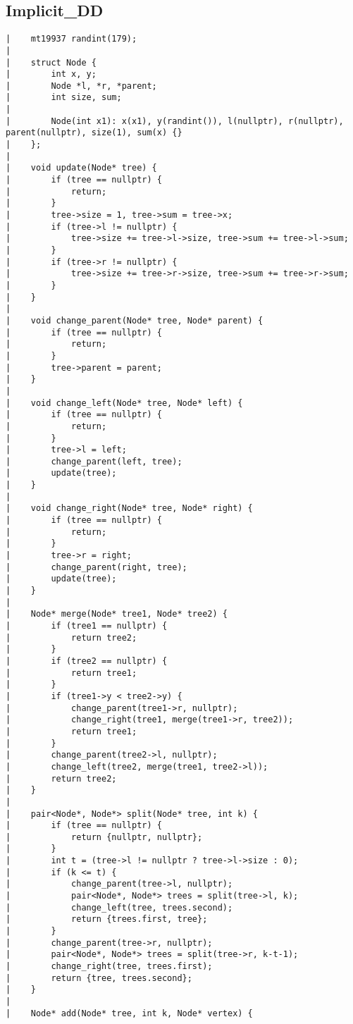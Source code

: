 \documentclass[a4paper, 10pt]{article}
\begin{document}
\begin{center}
\section*{Implicit\_DD}
\begin{verbatim}
|    mt19937 randint(179);
|    
|    struct Node {
|        int x, y;
|        Node *l, *r, *parent;
|        int size, sum;
|    
|        Node(int x1): x(x1), y(randint()), l(nullptr), r(nullptr), parent(nullptr), size(1), sum(x) {}
|    };
|    
|    void update(Node* tree) {
|        if (tree == nullptr) {
|            return;
|        }
|        tree->size = 1, tree->sum = tree->x;
|        if (tree->l != nullptr) {
|            tree->size += tree->l->size, tree->sum += tree->l->sum;
|        }
|        if (tree->r != nullptr) {
|            tree->size += tree->r->size, tree->sum += tree->r->sum;
|        }
|    }
|    
|    void change_parent(Node* tree, Node* parent) {
|        if (tree == nullptr) {
|            return;
|        }
|        tree->parent = parent;
|    }
|    
|    void change_left(Node* tree, Node* left) {
|        if (tree == nullptr) {
|            return;
|        }
|        tree->l = left;
|        change_parent(left, tree);
|        update(tree);
|    }
|    
|    void change_right(Node* tree, Node* right) {
|        if (tree == nullptr) {
|            return;
|        }
|        tree->r = right;
|        change_parent(right, tree);
|        update(tree);
|    }
|    
|    Node* merge(Node* tree1, Node* tree2) {
|        if (tree1 == nullptr) {
|            return tree2;
|        }
|        if (tree2 == nullptr) {
|            return tree1;
|        }
|        if (tree1->y < tree2->y) {
|            change_parent(tree1->r, nullptr);
|            change_right(tree1, merge(tree1->r, tree2));
|            return tree1;
|        }
|        change_parent(tree2->l, nullptr);
|        change_left(tree2, merge(tree1, tree2->l));
|        return tree2;
|    }
|    
|    pair<Node*, Node*> split(Node* tree, int k) {
|        if (tree == nullptr) {
|            return {nullptr, nullptr};
|        }
|        int t = (tree->l != nullptr ? tree->l->size : 0);
|        if (k <= t) {
|            change_parent(tree->l, nullptr);
|            pair<Node*, Node*> trees = split(tree->l, k);
|            change_left(tree, trees.second);
|            return {trees.first, tree};
|        }
|        change_parent(tree->r, nullptr);
|        pair<Node*, Node*> trees = split(tree->r, k-t-1);
|        change_right(tree, trees.first);
|        return {tree, trees.second};
|    }
|    
|    Node* add(Node* tree, int k, Node* vertex) {

\end{verbatim}
\end{center}
\end{document}
